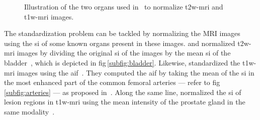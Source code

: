 \begin{figure}
\centering
	\hspace*{\fill}
	 \hfill
	\hspace*{\fill}
	\caption{Illustration of the two organs used in~\cite{Niaf2011,Niaf2012} to normalize \acs*{t2w}-\acs*{mri} and \ac{t1w}-\acs*{mri} images.}
	\label{fig:niaf}
\end{figure}

The standardization problem can be tackled by normalizing the MRI images using the \ac{si} of some known organs present in these images. 
\citeauthor{Niaf2012} and \citeauthor{lehaire2014computer} normalized \ac{t2w}-\ac{mri} images by dividing the original \ac{si} of the images by the mean \ac{si} of the bladder~\cite{Niaf2011,Niaf2012,lehaire2014computer}, which is depicted in \acs{fig}\,\ref{subfig:bladder}.
Likewise, \citeauthor{Niaf2011} standardized the \ac{t1w}-\ac{mri} images using the \ac{aif}~\cite{Niaf2011}.
They computed the \ac{aif} by taking the mean of the \ac{si} in the most enhanced part of the common femoral arteries --- refer to \acs{fig}\,\ref{subfig:arteries} --- as proposed in~\cite{Wiart2007}.
Along the same line, \citeauthor{samarasinghe2016semi} normalized the \ac{si} of lesion regions in \ac{t1w}-\ac{mri} using the mean intensity of the prostate gland in the same modality~\cite{samarasinghe2016semi}.

